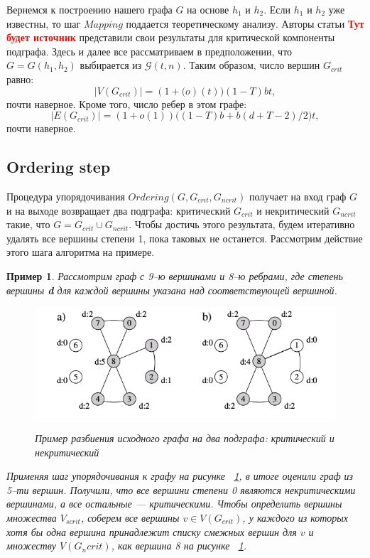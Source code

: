 \documentclass[specialist,
               substylefile = spbu.rtx,
               subf,href,colorlinks=true, 12pt]{disser}
\newtheorem{myexample}{Пример}
\begin{document}
Вернемся к построению нашего графа $G$ на основе $h_1$ и $h_2$. Если $h_1$ и $h_2$ уже известны, то шаг $Mapping$ поддается теоретическому анализу. Авторы статьи \textbf{\textcolor{red}{Тут будет источник}} представили свои результаты для критической компоненты подграфа. Здесь и далее все рассматриваем в предположении, что $G = G(h_1,h_2)$ выбирается из $\mathcal{G}(t,n)$. Таким образом, число вершин $G_{crit}$ равно:
%
\begin{equation}\label{eq1}
|V(G_{crit})| = (1+\mathit(o)(t))(1 - T)bt,
\end{equation}
%
почти наверное. Кроме того, число ребер в этом графе:
%
\begin{equation}\label{eq2}
|E(G_{crit})| = (1+\mathit{o}(1))\Big((1-T)b + b(d + T - 2)/2\Big)t,
\end{equation}
%
почти наверное. 

\newpage

\subsection{Ordering step}

Процедура упорядочивания $Ordering (G, G_{crit}, G_{ncrit})$ получает на вход граф $G$ и на выходе возвращает два подграфа: критический $G_{crit}$ и некритический $G_{ncrit}$ такие, что $G = G_{crit} \cup G_{ncrit}$. Чтобы достичь этого результата, будем итеративно удалять все вершины степени 1, пока таковых не останется. Рассмотрим действие этого шага алгоритма на примере.

\begin{myexample}
Рассмотрим граф с 9--ю вершинами и 8--ю ребрами, где степень вершины \textbf{d} для каждой вершины указана над соответствующей вершиной.

\begin{figure}[h]
\begin{center}
\includegraphics[scale=0.5]{imgs/ex2.jpg}\label{im:ex2}
\caption{Пример разбиения исходного графа на два подграфа: критический и некритический}
\end{center}
\end{figure}

Применяя шаг упорядочивания к графу на рисунке ~\ref{im:ex2}, в итоге оценили граф из 5--ти вершин. Получили, что все вершини степени 0 являются некритическими вершинами, а все остальные --- критическими. Чтобы определить вершины множества $V_{scrit}$, соберем все вершины $v \in V(G_{crit})$, у каждого из которых хотя бы одна вершина принадлежит списку смежных вершин для $v$ и множеству $V(G_ncrit)$, как вершина 8 на рисунке ~\ref{im:ex2}.
\end{myexample}
\end{document}
